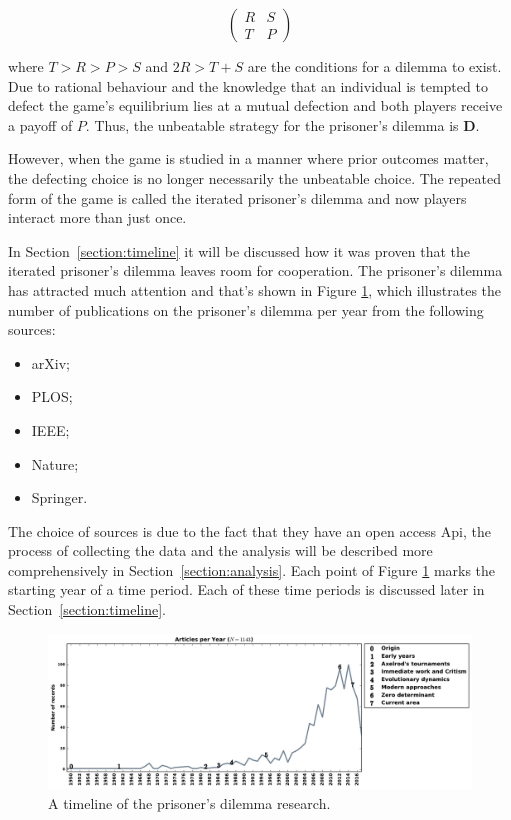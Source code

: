 \documentclass{article}
\begin{document}
\begin{equation} \label{eq:the_pd_payoffs}
    \begin{pmatrix}
    R & S \\ T & P
    \end{pmatrix}
\end{equation}

where \(T > R > P > S \) and \(2R > T + S\) are the conditions for a dilemma
to exist. Due to rational behaviour and the knowledge that an individual is tempted
to defect the game's equilibrium lies at a mutual defection and both players
receive a payoff of \(P\). Thus, the unbeatable strategy for the prisoner's dilemma
is \textbf{D}.

However, when the game is studied in a manner where prior outcomes matter, the 
defecting choice is no longer necessarily the unbeatable choice. The repeated 
form of the game is called the iterated prisoner's dilemma and now players 
interact more than just once.

In Section~\ref{section:timeline} it will be discussed how it was proven that
the iterated prisoner's dilemma leaves room for cooperation. The prisoner's
dilemma has attracted much attention and that's shown in Figure
\ref{fig:timeline}, which illustrates the number of 
publications on the prisoner's dilemma per year from the following sources:

\begin{multicols}{3}
    \begin{itemize}
        \item arXiv;
        \item PLOS;
        \item IEEE;
        \item Nature;
        \item Springer.
    \end{itemize}
\end{multicols}

The choice of sources is due to the fact that they have an open access Api, the 
process of collecting the data and the analysis will be described more
comprehensively in Section~\ref{section:analysis}. Each point of Figure
\ref{fig:timeline} marks the starting year of a time period. Each of these time
periods is discussed later in Section~\ref{section:timeline}.

\begin{figure}[!htbp]
    \centering
    \includegraphics[width=\textwidth]{assets/images/timeline.pdf}
    \caption{\label{fig:timeline} A timeline of the prisoner's dilemma research.}
\end{figure}
\end{document}
